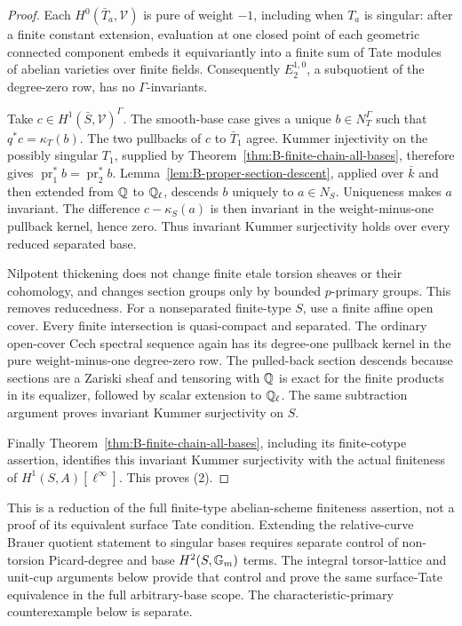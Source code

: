 \begin{proof}
Each \(H^0(\bar T_a,\mathcal V)\) is pure of weight
\(-1\), including when \(T_a\) is singular: after a
finite constant extension, evaluation at one closed point of
each geometric connected component embeds it equivariantly into
a finite sum of Tate modules of abelian varieties over finite
fields.  Consequently \(E_2^{1,0}\), a subquotient of the
degree-zero row, has no \(\Gamma\)-invariants.

Take \(c\in H^1(\bar S,\mathcal V)^\Gamma\).
The smooth-base case gives a unique \(b\in N_T^\Gamma\)
such that \(q^*c=\kappa_T(b)\).
The two pullbacks of \(c\) to \(\bar T_1\) agree.
Kummer injectivity on the possibly singular \(T_1\), supplied
by Theorem~\ref{thm:B-finite-chain-all-bases}, therefore
gives \(\operatorname{pr}_1^*b=\operatorname{pr}_2^*b\).
Lemma~\ref{lem:B-proper-section-descent}, applied over
\(\bar k\) and then extended from \(\mathbb Q\) to
\(\mathbb Q_\ell\), descends \(b\) uniquely to
\(a\in N_S\).  Uniqueness makes \(a\) invariant.
The difference \(c-\kappa_S(a)\) is then invariant in
the weight-minus-one pullback kernel, hence zero.  Thus
invariant Kummer surjectivity holds over every reduced separated
base.

Nilpotent thickening does not change finite etale torsion sheaves
or their cohomology, and changes section groups only by bounded
\(p\)-primary groups.  This removes reducedness.  For a
nonseparated finite-type \(S\), use a finite affine open
cover.  Every finite intersection is quasi-compact and separated.
The ordinary open-cover Cech spectral sequence again has its
degree-one pullback kernel in the pure weight-minus-one
degree-zero row.  The pulled-back section descends because
sections are a Zariski sheaf and tensoring with \(\mathbb Q\)
is exact for the finite products in its equalizer, followed by
scalar extension to \(\mathbb Q_\ell\).
The same subtraction argument proves invariant Kummer
surjectivity on \(S\).

Finally Theorem~\ref{thm:B-finite-chain-all-bases}, including
its finite-cotype assertion, identifies this invariant Kummer
surjectivity with the actual finiteness of
\(H^1(S,A)[\ell^\infty]\).  This proves (2).
\end{proof}

This is a reduction of the full finite-type abelian-scheme
finiteness assertion, not a proof of its equivalent surface Tate
condition.  Extending the relative-curve Brauer quotient
statement to singular bases requires separate control of
non-torsion Picard-degree and base \(H^2(S,{\mathbb G_m})\) terms.
The integral torsor-lattice and unit-cup arguments below provide
that control and prove the same surface-Tate equivalence in
the full arbitrary-base scope.  The characteristic-primary
counterexample below is separate.

